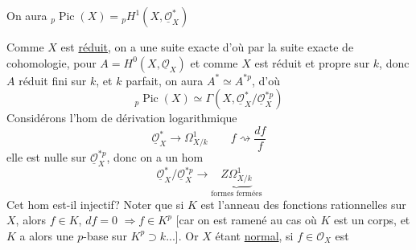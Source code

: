 On aura ${}_p\operatorname{Pic}(X)={}_pH^1(X,\underline{\mathcal O}_X^*)$

Comme $X$ est \uline{réduit}, on a une suite exacte
d'où par la suite exacte de cohomologie, pour $A=H^0(X,\underline{\mathcal O}_X)$
et comme $X$ est réduit et propre sur $k$, donc $A$ réduit
fini  sur $k$, et $k$ parfait, on aura
$A^*\simeq A^{*p}$, d'où
\[
{}_p\operatorname{Pic}(X)\simeq\Gamma(X,\underline{\mathcal O}_X^*/\underline{\mathcal O}_X^{*p})
\]
Considérons l'hom de dérivation logarithmique
\[
\underline{\mathcal O}_X^*\longrightarrow\Omega^1_{X/k}\qquad
f\rightsquigarrow\frac{df}{f}
\]
elle est nulle sur $\underline{\mathcal O}_X^{*p}$, donc on a un hom
\[
\underline{\mathcal O}_X^*/\underline{\mathcal O}_X^{*p}\longrightarrow
\underbrace{Z\Omega^1_{X/k}}_{\text{formes fermées}}
\]
Cet hom est-il injectif? Noter que si $K$ est l'anneau
des fonctions rationnelles sur $X$, alors $f\in K$, $df=0$
$\Rightarrow f\in K^p$ [car  on est ramené au cas où $K$
est un corps, et $K$  a alors une
$p$-base sur $K^p\supset k$...]. Or $X$ étant \uline{normal}, si $f\in\mathcal O_X$ est

